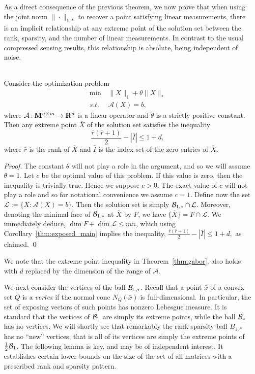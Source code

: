 \documentclass[smallextended,numbook]{svjour3}
\begin{document}
As a direct consequence of the previous theorem, we now prove that when using the joint norm $\|\cdot\|_{1,*}$ to recover a point satisfying linear measurements, there is an implicit relationship at any extreme point of the solution set between the rank, sparsity, and the number of linear measurements. In contrast to the usual compressed sensing results, this relationship is absolute, being independent of noise.
\begin{thm}\label{thm:gabor}\hfill \\
Consider the optimization problem 
\begin{align*}
\min~ &\|X\|_1 +\theta \|X\|_{*} \\
s.t.~~ &\mathcal{A}(X)=b,
\end{align*}
where $\mathcal{A}\colon {\bf M}^{n\times m}\to{{\bf R}}^d$ is a linear operator and $\theta$ is a strictly positive constant. Then any extreme point $\overline{X}$ of the solution set satisfies the inequality
$$\frac{\bar{r}(\bar{r}+1)}{2}-|\bar{I}| \leq 1 +d,$$
where $\bar{r}$ is the rank of $\overline{X}$ and $\bar{I}$ is the index set of the zero entries of $\overline{X}$.
\end{thm}
\begin{proof}
The constant $\theta$ will not play a role in the argument, and so we will assume $\theta=1$. Let $c$ be the optimal value of this problem. If this value is zero, then the inequality is trivially true. Hence we suppose $c >0$. The exact value of $c$ will not play a role and so for notational convenience we assume $c=1$. Define now the set $\mathcal{L}:=\{X: \mathcal{A}(X)=b\}$. Then the solution set is simply
${{\cal B}}_{1,*}\cap \mathcal{L}$. Moreover, denoting the minimal face of ${{\cal B}}_{1,*}$ at $\overline{X}$ by $F$, we have $\{\overline{X}\}=F\cap \mathcal{L}$. We immediately deduce, 
$\dim F +\dim \mathcal{L} \leq mn$,
which using Corollary~\ref{thm:exposed_main} implies the inequality, $\frac{\bar{r}(\bar{r}+1)}{2}-|\bar{I}| \leq 1 +d,$
as claimed.
\qed
\end{proof}

\begin{rem}{\rm
We note that the extreme point inequality in Theorem~\ref{thm:gabor}, also holds with $d$ replaced by the dimension of the range of ${\mathcal{A}}$.}
\end{rem}

We next consider the vertices of the ball ${{\cal B}}_{1,*}$. Recall that a point $\bar{x}$ of a convex set $Q$ is a {\em vertex} if the normal cone $N_Q(\bar{x})$ is full-dimensional. In particular, the set of exposing vectors of such points has nonzero Lebesgue measure. It is standard that the vertices of ${{\cal B}}_1$ are simply its extreme points, while the ball ${{\cal B}}_{*}$ has no vertices. We will shortly see that remarkably the rank sparsity ball $B_{1,*}$ has no ``new'' vertices, that is all of its vertices  are simply the extreme points of $\frac{1}{2}{{\cal B}}_{1}$. The following lemma is key, and may be of independent interest. It establishes certain lower-bounds on the size of the set of all matrices with a prescribed rank and sparsity pattern.
\end{document}
